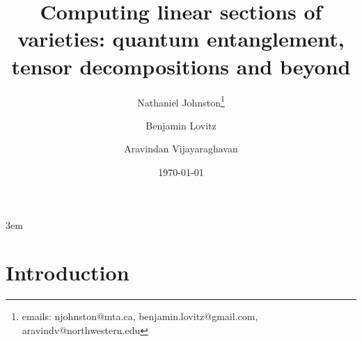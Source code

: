 \documentclass[11pt]{article}
\theoremstyle{definition}
\newcommand{\anote}[1]{}
\begin{document}
\emergencystretch 3em
\title{\bf
Computing linear sections of varieties: quantum entanglement, tensor decompositions and beyond
}



 \author[$\dagger$]{Nathaniel Johnston\thanks{emails: njohnston@mta.ca, benjamin.lovitz@gmail.com, aravindv@northwestern.edu}}
 \author[$* \ddagger$]{
   Benjamin Lovitz}
  \author[$* \S$]{Aravindan Vijayaraghavan}

\date{\today}

\maketitle
\begin{abstract}


\end{abstract}
\newpage
\tableofcontents
\newpage
\section{Introduction}\label{intro}

\end{document}
